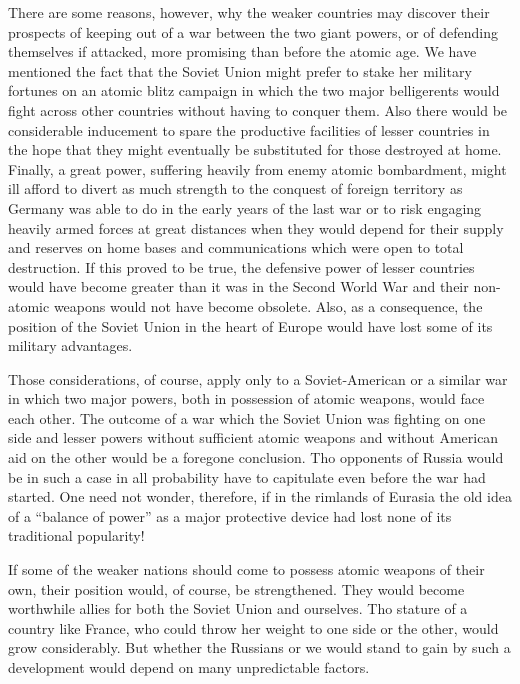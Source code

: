 There are some reasons, however, why the weaker countries may discover their prospects of keeping out of a war between the two giant powers, or of defending themselves if attacked, more promising than before the atomic age. We have mentioned the fact that the Soviet Union might prefer to stake her military fortunes on an atomic blitz campaign in which the two major belligerents would fight across other countries without having to conquer them. Also there would be considerable inducement to spare the productive facilities of lesser countries in the hope that they might eventually be substituted for those destroyed at home. Finally, a great power, suffering heavily from enemy atomic bombardment, might ill afford to divert as much strength to the conquest of foreign territory as Germany was able to do in the early years of the last war or to risk engaging heavily armed forces at great distances when they would depend for their supply and reserves on home bases and communications which were open to total destruction. If this proved to be true, the defensive power of lesser countries would have become greater than it was in the Second World War and their non-atomic weapons would not have become obsolete. Also, as a consequence, the position of the Soviet Union in the heart of Europe would have lost some of its military advantages.

Those considerations, of course, apply only to a Soviet-American or a similar war in which two major powers, both in possession of atomic weapons, would face each other. The outcome of a war which the Soviet Union was fighting on one side and lesser powers without sufficient atomic weapons and without American aid on the other would be a foregone conclusion. Tho opponents of Russia would be in such a case in all probability have to capitulate even before the war had started. One need not wonder, therefore, if in the rimlands of Eurasia the old idea of a ``balance of power'' as a major protective device had lost none of its traditional popularity!

If some of the weaker nations should come to possess atomic weapons of their own, their position would, of course, be strengthened. They would become worthwhile allies for both the Soviet Union and ourselves. Tho stature of a country like France, who could throw her weight to one side or the other, would grow considerably. But whether the Russians or we would stand to gain by such a development would depend on many unpredictable factors.

